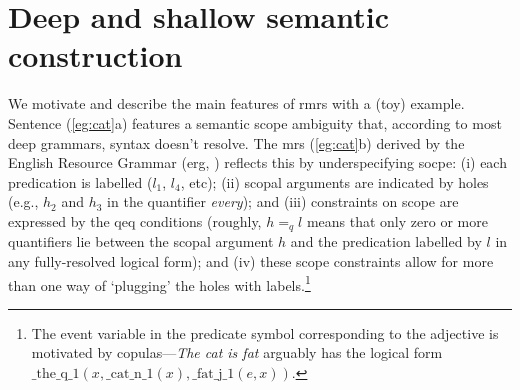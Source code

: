 \section{Deep and shallow semantic construction}
\label{sec:motivation}

%

We motivate and describe the main features of {\sc rmrs} with a (toy)
example.  Sentence 
(\ref{eg:cat}a) features a semantic scope ambiguity that, according to
most deep grammars, syntax
doesn't resolve.    The {\sc mrs} (\ref{eg:cat}b) derived by the
English Resource Grammar ({\sc erg}, \cite{copestake:flickinger:2000})
reflects this by underspecifying socpe: (i) each predication is
labelled ($l_1$, $l_4$, etc); (ii) scopal arguments are indicated by
holes (e.g., $h_2$ and $h_3$ in the quantifier {\em every}); and (iii)
constraints on scope are expressed by the qeq conditions (roughly, $h
=_q l$ means that only zero or more quantifiers lie between the scopal
argument $h$ and the predication labelled by $l$ in any fully-resolved
logical form); and (iv) these scope
constraints allow for more than one way of `plugging' the holes with
labels.\footnote{The event variable in the predicate symbol
  corresponding to the adjective is motivated by copulas---{\em The
    cat is fat} arguably has the logical form 
  $\mbox{\_the\_q\_1}(x,\mbox{\_cat\_n\_1}(x),\mbox{\_fat\_j\_1}(e,x))$.}
